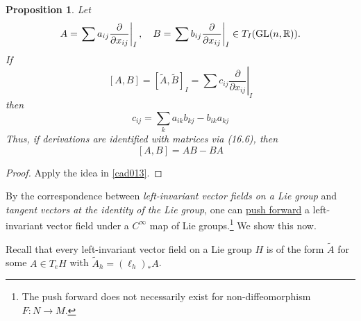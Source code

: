 \documentclass{amsart}
\let\originalmathbb\mathbb
\renewcommand{\mathbb}[1]{%
    \ifstrequal{#1}{1}{\mathbbm{#1}}{\originalmathbb{#1}}%
}
\theoremstyle{plain}
\newtheorem{proposition}[theorem]{Proposition}
\theoremstyle{definition}
\theoremstyle{remark}
\begin{document}
\begin{proposition}
Let
\[
A=\left.\sum a_{i j} \frac{\partial}{\partial x_{i j}}\right|_I, \quad B=\left.\sum b_{i j} \frac{\partial}{\partial x_{i j}}\right|_I \in T_I(\operatorname{GL}(n, \mathbb{R})) .
\]If
\[
[A, B]=[\tilde{A}, \tilde{B}]_I=\left.\sum c_{i j} \frac{\partial}{\partial x_{i j}}\right|_I
\]then
\[
c_{i j}=\sum_k a_{i k} b_{k j}-b_{i k} a_{k j}
\]Thus, if derivations are identified with matrices via (16.6), then
\[
[A, B]=A B-B A
\]
\end{proposition}
\begin{proof}
Apply the idea in \cref{cad013}.

\end{proof}

By the correspondence between \textit{left-invariant vector fields on a Lie group} and \textit{tangent vectors at the identity of the Lie group}, one can \underline{push forward} a left-invariant vector field under a $C^{\infty}$ map of Lie groups.\footnote{The push forward does not necessarily exist for non-diffeomorphism $F:N\to M$.} We show this now.

Recall that every left-invariant vector field on a Lie group $H$ is of the form $\widetilde{A}$ for some $A\in T_{e}H$ with $\widetilde{A}_{h}=(\ell_{h})_{*}A$.
\end{document}
